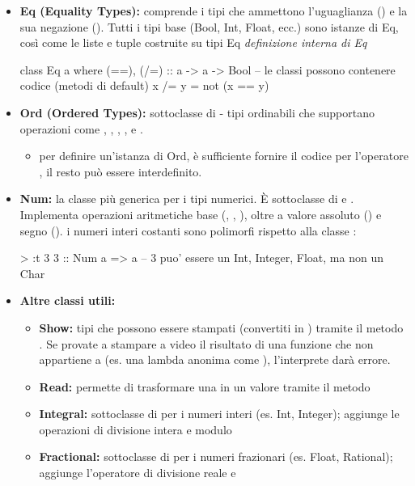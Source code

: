 \documentclass[a4paper,11pt]{report}
\begin{document}
\begin{itemize}
    \item \textbf{Eq (Equality Types):} comprende i tipi che ammettono l'uguaglianza (\code{==}) e la sua negazione (\code{/=}). Tutti i tipi base (Bool, Int, Float, ecc.) sono istanze di Eq, così come le liste e tuple costruite su tipi Eq
        \subitem \textit{definizione interna di Eq}
        \begin{haskellbox}{}
class Eq a where
  (==), (/=) :: a -> a -> Bool
  -- le classi possono contenere codice (metodi di default)
  x /= y = not (x == y)
\end{haskellbox}

    \item \textbf{Ord (Ordered Types):} sottoclasse di  - tipi ordinabili che supportano operazioni come \code{<=}, \code{<}, \code{>=}, \code{>},  e .
\begin{itemize}
    \item per definire un'istanza di Ord, è sufficiente fornire il codice per l'operatore \code{<}, il resto può essere interdefinito.
\end{itemize}

    \item \textbf{Num:} la classe più generica per i tipi numerici. È sottoclasse di  e . Implementa operazioni aritmetiche base (\code{+}, \code{-}, \code{*}), oltre a valore assoluto () e segno ().
        \subitem i numeri interi costanti sono polimorfi rispetto alla classe :
        \begin{haskellbox}{}
> :t 3
3 :: Num a => a  -- 3 puo' essere un Int, Integer, Float, ma non un Char
\end{haskellbox}

    \item \textbf{Altre classi utili:}
        \begin{itemize}
            \item \textbf{Show:} tipi che possono essere stampati (convertiti in ) tramite il metodo . Se provate a stampare a video il risultato di una funzione che non appartiene a  (es. una lambda anonima come ), l'interprete darà errore.
            \item \textbf{Read:} permette di trasformare una  in un valore tramite il metodo 
            \item \textbf{Integral:} sottoclasse di  per i numeri interi (es. Int, Integer); aggiunge le operazioni di divisione intera  e modulo 
            \item \textbf{Fractional:} sottoclasse di  per i numeri frazionari (es. Float, Rational); aggiunge l'operatore di divisione reale \code{(/)} e 
        \end{itemize}
\end{itemize}
\end{document}
